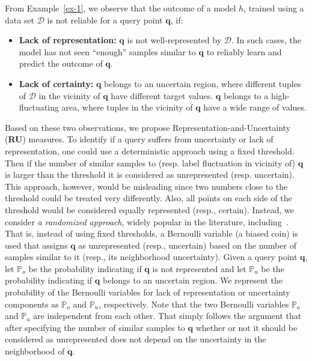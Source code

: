 \documentclass[11pt]{article}
\newcommand{\dee}{\mathcal{D}}
\newcommand{\qu}{\mathbf{q}}
\newcommand{\pe}{\mathbb{P}}
\begin{document}
From Example~\ref{ex-1}, we observe that the outcome of a model $h$, trained using a data set $\dee$ is not reliable for a query point $\qu$, if:
\begin{itemize}
    \item {\bf Lack of representation:} $\qu$ is not well-represented by $\dee$.
    In such cases, the model has not seen ``enough'' samples similar to $\qu$ to reliably learn and predict the outcome of $\qu$.
    \item {\bf Lack of certainty:} $\qu$ belongs to an uncertain region, where different tuples of $\dee$ in the vicinity of $\qu$ have different target values. $\qu$ belongs to a high-fluctuating area, where tuples in the vicinity of $\qu$ have a wide range of values.
\end{itemize} \vspace{2mm}

\noindent
Based on these two observations, we propose Representation-and-Uncertainty ({\bf RU}) measures.
To identify if a query suffers from uncertainty or lack of representation, one could use a deterministic approach using a fixed threshold. Then if the number of similar samples to (resp. label fluctuation in vicinity of) $\qu$ is larger than the threshold it is considered as unrepresented (resp. uncertain).
This approach, however, would be misleading since two numbers close to the threshold could be treated very differently. Also, all points on each side of the threshold would be considered equally represented (resp., certain). Instead, we consider {\it a randomized approach}, widely popular in the literature, including~\cite{dwork2012fairness}.
That is, instead of using fixed thresholds, a Bernoulli variable (a biased coin) is used that 
assigns $\qu$ as unrepresented (resp., uncertain) based on the number of samples similar to it (resp., its neighborhood uncertainty).
Given a query point $\qu$, let $\pe_o$ be the probability indicating if $\qu$ is not represented and let $\pe_u$ be the probability indicating if $\qu$ belongs to an uncertain region. 
We represent the probability of the Bernoulli variables for lack of representation or uncertainty components as $\pe_o$ and $\pe_u$, respectively. Note that the two Bernoulli variables $\pe_o$ and $\pe_u$ are independent from each other. That simply follows the argument that after specifying the number of similar samples to $\qu$ whether or not it should be considered as unrepresented does not depend on the uncertainty in the neighborhood of $\qu$.
\end{document}
